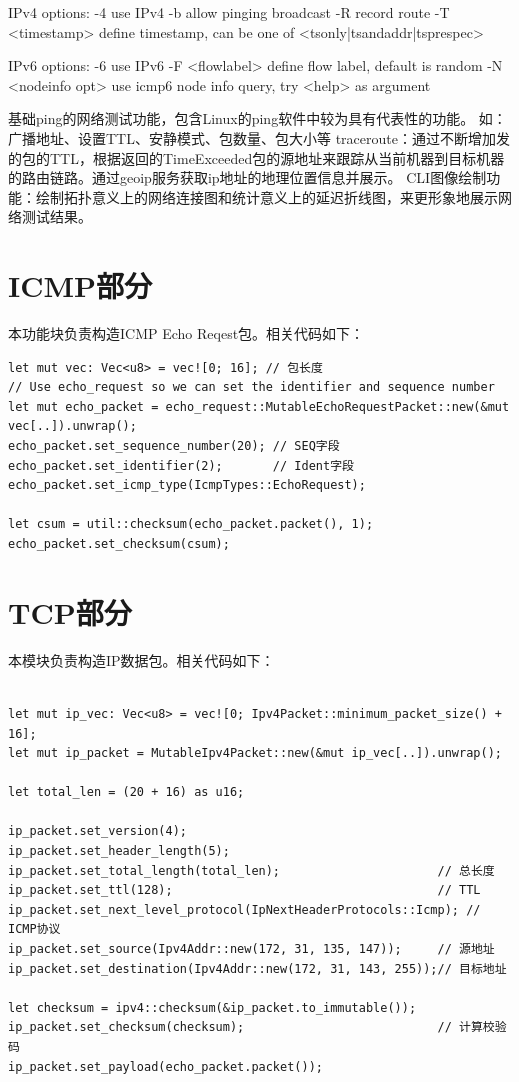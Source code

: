 \documentclass{ctexart}
\begin{document}
IPv4 options:
  -4                 use IPv4
  -b                 allow pinging broadcast
  -R                 record route
  -T <timestamp>     define timestamp, can be one of <tsonly|tsandaddr|tsprespec>

IPv6 options:
  -6                 use IPv6
  -F <flowlabel>     define flow label, default is random
  -N <nodeinfo opt>  use icmp6 node info query, try <help> as argument

\fi
\begin{outline}
    \1 基础ping的网络测试功能，包含Linux的ping软件中较为具有代表性的功能。
        \2 如：广播地址、设置TTL、安静模式、包数量、包大小等
    \1 traceroute：通过不断增加发的包的TTL，根据返回的TimeExceeded包的源地址来跟踪从当前机器到目标机器的路由链路。通过geoip服务获取ip地址的地理位置信息并展示。
    \1 CLI图像绘制功能：绘制拓扑意义上的网络连接图和统计意义上的延迟折线图，来更形象地展示网络测试结果。
\end{outline}

\section{ICMP部分}
本功能块负责构造ICMP Echo Reqest包。相关代码如下：
\begin{verbatim}
let mut vec: Vec<u8> = vec![0; 16]; // 包长度
// Use echo_request so we can set the identifier and sequence number
let mut echo_packet = echo_request::MutableEchoRequestPacket::new(&mut vec[..]).unwrap();
echo_packet.set_sequence_number(20); // SEQ字段
echo_packet.set_identifier(2);       // Ident字段
echo_packet.set_icmp_type(IcmpTypes::EchoRequest);

let csum = util::checksum(echo_packet.packet(), 1);
echo_packet.set_checksum(csum);
\end{verbatim}

\section{TCP部分}
本模块负责构造IP数据包。相关代码如下：
\begin{verbatim}

let mut ip_vec: Vec<u8> = vec![0; Ipv4Packet::minimum_packet_size() + 16];
let mut ip_packet = MutableIpv4Packet::new(&mut ip_vec[..]).unwrap();

let total_len = (20 + 16) as u16;

ip_packet.set_version(4);
ip_packet.set_header_length(5);
ip_packet.set_total_length(total_len);                      // 总长度
ip_packet.set_ttl(128);                                     // TTL
ip_packet.set_next_level_protocol(IpNextHeaderProtocols::Icmp); // ICMP协议
ip_packet.set_source(Ipv4Addr::new(172, 31, 135, 147));     // 源地址
ip_packet.set_destination(Ipv4Addr::new(172, 31, 143, 255));// 目标地址

let checksum = ipv4::checksum(&ip_packet.to_immutable());
ip_packet.set_checksum(checksum);                           // 计算校验码
ip_packet.set_payload(echo_packet.packet());
\end{verbatim}
\end{document}

